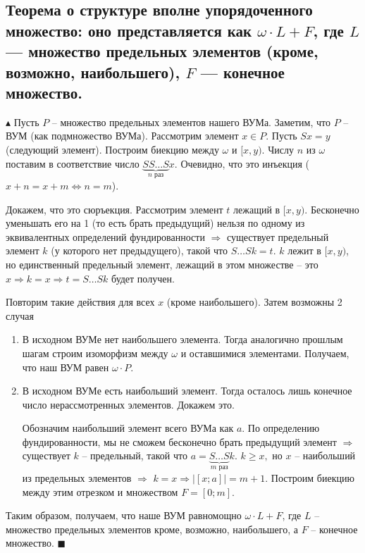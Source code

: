 \subsection{Теорема о структуре вполне упорядоченного множество: оно представляется как $\omega \cdot L + F$, где $L$ — множество предельных элементов (кроме, возможно, наибольшего), $F$ — конечное множество.}

\par $\blacktriangle$ Пусть $P$ -- множество предельных элементов нашего ВУМа. Заметим, что $P$ -- ВУМ (как подмножество ВУМа). Рассмотрим элемент $x \in P$. Пусть $Sx=y$ (следующий элемент). Построим биекцию между $\omega$ и $[x, y)$. Числу $n$ из $\omega$ поставим в соответствие число $\underbrace{SS\ldots S}_\text{$n$ раз}x$. Очевидно, что это инъекция ($x+n=x+m \Leftrightarrow n=m$).
\par Докажем, что это сюръекция. Рассмотрим элемент $t$ лежащий в $[x,y)$. Бесконечно уменьшать его на 1 (то есть брать предыдущий) нельзя по одному из эквивалентных определений фундированности $\Rightarrow$ существует предельный элемент $k$ (у которого нет предыдущего), такой что  $S\ldots Sk=t$. $k$ лежит в $[x,y)$, но единственный предельный элемент, лежащий в этом множестве -- это $x \Rightarrow k=x \Rightarrow t=S\ldots Sk$ будет получен. 
\par Повторим такие действия для всех $x$ (кроме наибольшего). Затем возможны 2 случая
\begin{enumerate}
    \item В исходном ВУМе нет наибольшего элемента. Тогда аналогично прошлым шагам строим изоморфизм между $\omega$ и оставшимися элементами. Получаем, что наш ВУМ равен $\omega \cdot P$.
    \item В исходном ВУМе есть наибольший элемент. Тогда осталось лишь конечное число нерассмотренных элементов. Докажем это.
    \par Обозначим наибольший элемент всего ВУМа как $a$. По определению фундированности, мы не сможем бесконечно брать предыдущий элемент $\Rightarrow$ существует $k$ -- предельный, такой что $a=\underbrace{S\ldots S}_\text{$m$ раз}k$. $k \geq x,$ но $x$ -- наибольший из предельных элементов $\Rightarrow$ $k=x \Rightarrow |[x;a]|=m+1$. Построим биекцию между этим отрезком и множеством $F=[0;m]$.
\end{enumerate}

\par Таким образом, получаем, что наше ВУМ равномощно $\omega \cdot L + F$, где $L$ -- множество предельных элементов кроме, возможно, наибольшего, а $F$ -- конечное множество. $\blacksquare$


